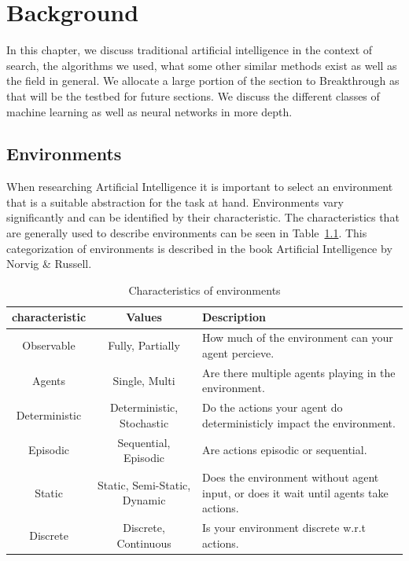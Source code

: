 \chapter{Background\label{cha:background}}

In this chapter, we discuss traditional artificial intelligence in the context of search, the algorithms we used, what some other similar methods exist as well as the field in general. We allocate a large portion of the section to Breakthrough as that will be the testbed for future sections. We discuss the different classes of machine learning as well as neural networks in more depth.

\section{Environments}
\label{sec:environments}

When researching Artificial Intelligence it is important to select an environment that is a suitable abstraction for the task at hand. Environments vary significantly and can be identified by their characteristic. The characteristics that are generally used to describe environments can be seen in Table~\ref{tab:env_characteristics}. This categorization of environments is described in the book Artificial Intelligence by Norvig \& Russell. \cite{Russell:AIModern}

\begin{table}[ht]
  \centering
  \begin{tabular}{|c|c|p{6cm}|}
    \hline
    \textbf{characteristic} & \textbf{Values}              & \textbf{Description}                                                                 \\
    \hline
    Observable              & Fully, Partially             & How much of the environment can your agent percieve.                                 \\
    \hline
    Agents                  & Single, Multi                & Are there multiple agents playing in the environment.                                \\
    \hline
    Deterministic           & Deterministic, Stochastic    & Do the actions your agent do deterministicly impact the environment.                 \\
    \hline
    Episodic                & Sequential, Episodic         & Are actions episodic or sequential.                                                  \\
    \hline
    Static                  & Static, Semi-Static, Dynamic & Does the environment without agent input, or does it wait until agents take actions. \\
    \hline
    Discrete                & Discrete, Continuous         & Is your environment discrete w.r.t actions.                                          \\
    \hline
  \end{tabular}
  \caption{Characteristics of environments}
  \label{tab:env_characteristics}
\end{table}

